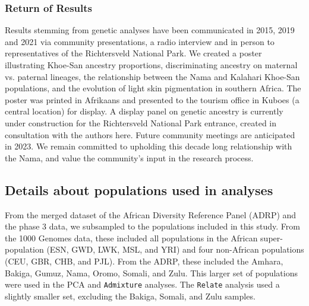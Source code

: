 \documentclass[]{article}
\begin{document}
\subsubsection{Return of Results}

Results stemming from genetic analyses have been communicated in 2015, 2019 and
2021 via community presentations, a radio interview and in person to
representatives of the Richtersveld National Park. We created a poster
illustrating Khoe-San ancestry proportions, discriminating ancestry on maternal
vs. paternal lineages, the relationship between the Nama and Kalahari Khoe-San
populations, and the evolution of light skin pigmentation in southern Africa.
The poster was printed in Afrikaans and presented to the tourism office in
Kuboes (a central location) for display. A display panel on genetic ancestry is
currently under construction for the Richtersveld National Park entrance,
created in consultation with the authors here. Future community meetings are
anticipated in 2023. We remain committed to upholding this decade long
relationship with the Nama, and value the community’s input in the research
process.


\subsection{Details about populations used in analyses}
\label{sec:populations-used}

From the merged dataset of the African Diversity Reference Panel (ADRP)
\citep{Gurdasani2015-qy,Pagani2015-pz}
and the \citet{1000_Genomes_Project_Consortium2015-zq} phase 3 data,
we subsampled to the populations included in this study. From the 1000 Genomes
data, these included all populations in the African super-population (ESN, GWD,
LWK, MSL, and YRI) and four non-African populations (CEU, GBR, CHB, and PJL).
From the ADRP, these included the Amhara, Bakiga, Gumuz, Nama, Oromo, Somali,
and Zulu. This larger set of populations were used in the PCA and
\texttt{Admixture} analyses. The \texttt{Relate} analysis used a slightly
smaller set, excluding the Bakiga, Somali, and Zulu samples.
\end{document}
